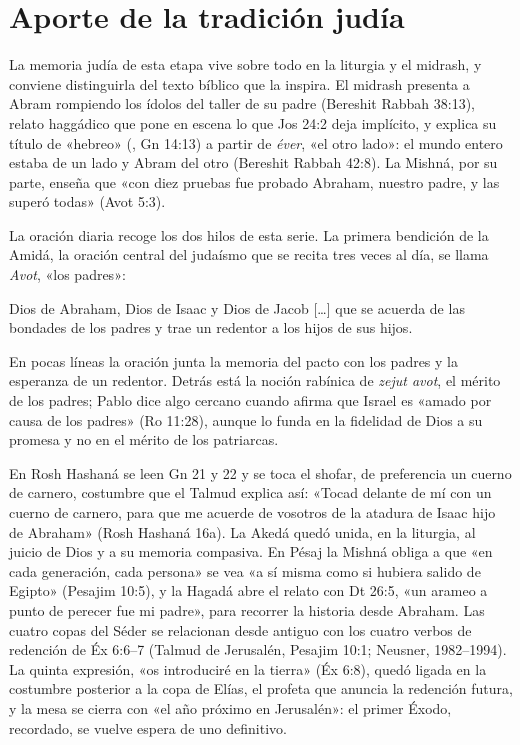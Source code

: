 \section{Aporte de la tradición judía}

La memoria judía de esta etapa vive sobre todo en la liturgia y el midrash, y conviene distinguirla del texto bíblico que la inspira. El midrash presenta a Abram rompiendo los ídolos del taller de su padre (Bereshit Rabbah 38:13), relato haggádico que pone en escena lo que Jos 24:2 deja implícito, y explica su título de «hebreo» (, Gn 14:13) a partir de \emph{éver}, «el otro lado»: el mundo entero estaba de un lado y Abram del otro (Bereshit Rabbah 42:8). La Mishná, por su parte, enseña que «con diez pruebas fue probado Abraham, nuestro padre, y las superó todas» (Avot 5:3).

La oración diaria recoge los dos hilos de esta serie. La primera bendición de la Amidá, la oración central del judaísmo que se recita tres veces al día, se llama \emph{Avot}, «los padres»:

\begin{cita}Dios de Abraham, Dios de Isaac y Dios de Jacob [\ldots] que se acuerda de las bondades de los padres y trae un redentor a los hijos de sus hijos.\end{cita}

En pocas líneas la oración junta la memoria del pacto con los padres y la esperanza de un redentor. Detrás está la noción rabínica de \emph{zejut avot}, el mérito de los padres; Pablo dice algo cercano cuando afirma que Israel es «amado por causa de los padres» (Ro 11:28), aunque lo funda en la fidelidad de Dios a su promesa y no en el mérito de los patriarcas.

En Rosh Hashaná se leen Gn 21 y 22 y se toca el shofar, de preferencia un cuerno de carnero, costumbre que el Talmud explica así: «Tocad delante de mí con un cuerno de carnero, para que me acuerde de vosotros de la atadura de Isaac hijo de Abraham» (Rosh Hashaná 16a). La Akedá quedó unida, en la liturgia, al juicio de Dios y a su memoria compasiva. En Pésaj la Mishná obliga a que «en cada generación, cada persona» se vea «a sí misma como si hubiera salido de Egipto» (Pesajim 10:5), y la Hagadá abre el relato con Dt 26:5, «un arameo a punto de perecer fue mi padre», para recorrer la historia desde Abraham. Las cuatro copas del Séder se relacionan desde antiguo con los cuatro verbos de redención de Éx 6:6–7 (Talmud de Jerusalén, Pesajim 10:1; Neusner, 1982--1994). La quinta expresión, «os introduciré en la tierra» (Éx 6:8), quedó ligada en la costumbre posterior a la copa de Elías, el profeta que anuncia la redención futura, y la mesa se cierra con «el año próximo en Jerusalén»: el primer Éxodo, recordado, se vuelve espera de uno definitivo.

